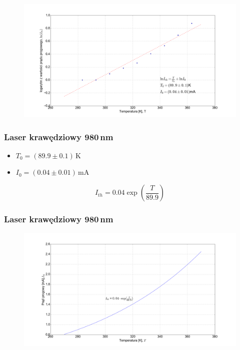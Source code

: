 \documentclass[xcolor={dvipsnames,table}]{beamer}
\begin{document}
\begin{frame}
\center
\begin{figure}
   \includegraphics[width=1.10\textwidth,natwidth=69,natheight=87]{fit_i_th.png}
\end{figure}
\end{frame}

\begin{frame}
\frametitle{Laser krawędziowy 980\,nm}
\begin{itemize}
\item $T_0 = (89.9 \pm 0.1)$\,K
\item $I_0 = (0.04 \pm 0.01)$\,mA
\end{itemize}
\begin{equation*}
I_{th} = 0.04 \exp \left( \frac{T}{89.9} \right)
\end{equation*}
\end{frame}

\begin{frame}
\frametitle{Laser krawędziowy 980\,nm}
\center
\begin{figure}
   \includegraphics[width=1.10\textwidth,natwidth=69,natheight=87]{plot_i_th.png}
\end{figure}
\end{frame}
\end{document}
